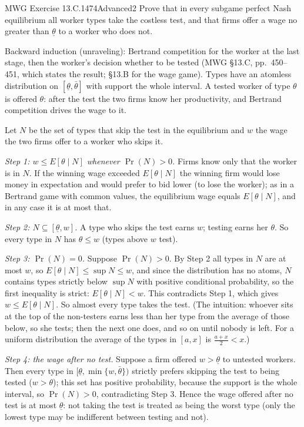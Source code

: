 \begin{exsol}{MWG Exercise 13.C.1}{474}{Advanced}{2}
\asked Prove that in every subgame perfect Nash equilibrium all worker types take the costless test,
and that firms offer a wage no greater than $\underline{\theta}$ to a worker who does not.

\method Backward induction (unraveling): Bertrand competition for the worker at the last stage, then
the worker's decision whether to be tested (MWG \S13.C, pp.~450--451, which states the result; \S13.B for
the wage game). Types have an atomless distribution on $[\underline{\theta}, \bar{\theta}]$ with
support the whole interval. A tested worker of type $\theta$ is offered $\theta$: after the test the
two firms know her productivity, and Bertrand competition drives the wage to it.

\solution Let $N$ be the set of types that skip the test in the equilibrium and $w$ the wage the
two firms offer to a worker who skips it.

\emph{Step 1: $w \le E[\theta \mid N]$ whenever $\Pr(N) > 0$.} Firms know only that the worker is in $N$.
If the winning wage exceeded $E[\theta \mid N]$ the winning firm would lose money in expectation and
would prefer to bid lower (to lose the worker); as in a Bertrand game with common values,
the equilibrium wage equals $E[\theta \mid N]$, and in any case it is at most that.

\emph{Step 2: $N \subseteq [\underline{\theta}, w]$.} A type who skips the test earns $w$; testing earns
her $\theta$. So every type in $N$ has $\theta \le w$ (types above $w$ test).

\emph{Step 3: $\Pr(N) = 0$.} Suppose $\Pr(N) > 0$. By Step 2 all types in $N$ are at most
$w$, so $E[\theta \mid N] \le \sup N \le w$, and since the distribution has no atoms, $N$ contains
types strictly below $\sup N$ with positive conditional probability, so the first inequality is strict:
$E[\theta \mid N] < w$. This contradicts Step 1, which gives $w \le E[\theta \mid N]$. So almost every type
takes the test. (The intuition: whoever sits at the top of the non-testers earns less than her type
from the average of those below, so she tests; then the next one does, and so on until nobody is left.
For a uniform distribution the average of the types in $[a, x]$ is $\frac{a+x}{2} < x$.)

\emph{Step 4: the wage after no test.} Suppose a firm offered $w > \underline{\theta}$ to untested workers.
Then every type in $[\underline{\theta}, \min\{w, \bar{\theta}\})$ strictly prefers skipping the test to being
tested ($w > \theta$); this set has positive probability, because the support is the whole interval, so
$\Pr(N) > 0$, contradicting Step 3. Hence the wage offered after no test is at most
$\underline{\theta}$: not taking the test is treated as being the worst type (only the lowest type may
be indifferent between testing and not).


\end{exsol}
